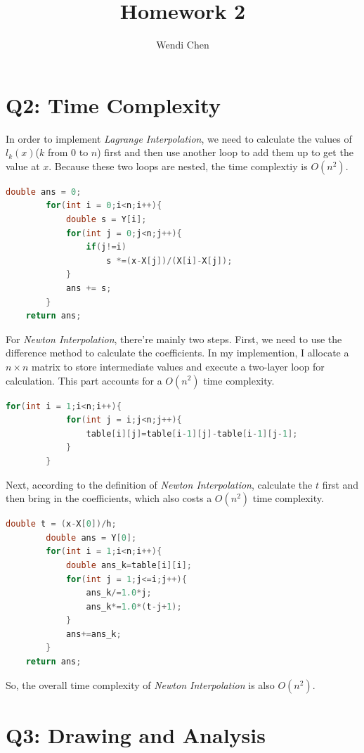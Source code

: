 \documentclass[a4paper]{article}
\title{\textbf{Homework 2}}
\author{Wendi Chen}
\date{}
\begin{document}
\maketitle

\section{Q2: Time Complexity}
In order to implement \emph{Lagrange Interpolation}, we need to calculate the values of $l_{k}(x)$($k$ from $0$ to $n$) first and then use another loop to add them up to get the value at $x$.
Because these two loops are nested, the time complextiy is $O(n^{2})$.
\begin{lstlisting}[language={c++}]
        double ans = 0;
        for(int i = 0;i<n;i++){
            double s = Y[i];
            for(int j = 0;j<n;j++){
                if(j!=i)
                    s *=(x-X[j])/(X[i]-X[j]);
            }
            ans += s;
        }
	return ans;
\end{lstlisting}

For \emph{Newton Interpolation}, there're mainly two steps.
First, we need to use the difference method to calculate the coefficients.
In my implemention, I allocate a $n\times n$ matrix to store intermediate values and execute a two-layer loop for calculation.
This part accounts for a $O(n^{2})$ time complexity.

\begin{lstlisting}[language={c++}]
	for(int i = 1;i<n;i++){
            for(int j = i;j<n;j++){
                table[i][j]=table[i-1][j]-table[i-1][j-1];
            }
        }
\end{lstlisting}

Next, according to the definition of \emph{Newton Interpolation}, calculate the $t$ first and then bring in the coefficients, which also costs a $O(n^{2})$ time complexity. 
\begin{lstlisting}[language={c++}]
	double t = (x-X[0])/h;
        double ans = Y[0];
        for(int i = 1;i<n;i++){
            double ans_k=table[i][i];
            for(int j = 1;j<=i;j++){
                ans_k/=1.0*j;
                ans_k*=1.0*(t-j+1);
            }
            ans+=ans_k;
        }
	return ans;
\end{lstlisting}

So, the overall time complexity of \emph{Newton Interpolation} is also $O(n^{2})$.

\section{Q3: Drawing and Analysis}
\end{document}
